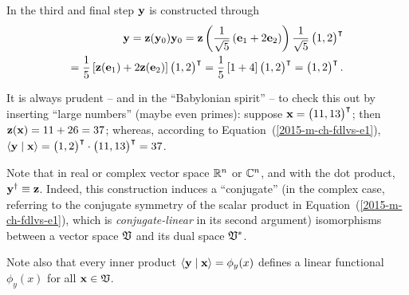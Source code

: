 {In the third and final step ${\bf y}$ is constructed through
\begin{equation}
\begin{split}
{\bf y}
=  {\bf z}  ( {\bf y}_0 ){\bf y}_0
=  {\bf z}  \left( \frac{1}{\sqrt{5}}\left( {\bf e}_1 +2 {\bf e}_2 \right) \right)\frac{1}{\sqrt{5}} \begin{pmatrix} 1,2\end{pmatrix}^\intercal   \\
= \frac{1}{5}  \left[ {\bf z} ( {\bf e}_1) + 2 {\bf z}  ( {\bf e}_2 ) \right] \begin{pmatrix} 1,2\end{pmatrix}^\intercal
= \frac{1}{5}  \left[ 1 + 4 \right] \begin{pmatrix} 1,2\end{pmatrix}^\intercal
=    \begin{pmatrix} 1,2\end{pmatrix}^\intercal
.
\end{split}
\end{equation}

It is always prudent -- and in the ``Babylonian spirit'' -- to check this out by inserting ``large numbers'' (maybe even primes):
suppose ${\bf x} =\begin{pmatrix} 11,13\end{pmatrix}^\intercal $; then
${\bf z}  ( {\bf x} ) = 11 + 26 = 37$; whereas, according to Equation~(\ref{2015-m-ch-fdlvs-e1}),
$\langle {\bf y}\mid {\bf x}\rangle = \begin{pmatrix} 1,2\end{pmatrix}^\intercal   \cdot      \begin{pmatrix} 11,13\end{pmatrix}^\intercal
= 37$.


\eexample
}

Note that  in  real or complex vector space ${\Bbb R}^n$ or ${\Bbb C}^n$, and with the dot product,  ${\bf y}^\dagger \equiv {\bf z}$.
Indeed, this construction induces a ``conjugate'' (in the complex case, referring to the conjugate symmetry of the scalar product
in Equation~(\ref{2015-m-ch-fdlvs-e1}),
which is {\em conjugate-linear} in its second argument) isomorphisms between a vector space
${\frak V}$ and its dual space ${\frak V}^\ast$.


Note also that every inner product
$\langle {\bf y}\mid {\bf x} \rangle = \phi_y(x)$ defines a linear
functional $\phi_y(x)$ for all ${\bf x}\in {\frak V}$.




